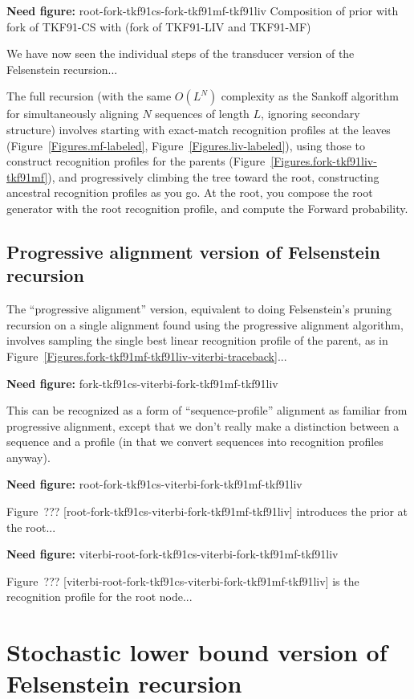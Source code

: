 \documentclass{article}
\newcommand{\figref}[1]{Figure~\ref{Figures.#1}}
\newcommand{\needfig}[1]{{\bf Need figure: } #1 }
\newcommand{\needfigref}[1]{Figure~??? [#1] }
\begin{document}
\needfig{root-fork-tkf91cs-fork-tkf91mf-tkf91liv
 Composition of prior with fork of TKF91-CS with (fork of TKF91-LIV and TKF91-MF)}

We have now seen the individual steps of the transducer version of the Felsenstein recursion...

The full recursion (with the same $O(L^N)$ complexity as the Sankoff algorithm
for simultaneously aligning $N$ sequences of length $L$, ignoring secondary structure)
involves starting with exact-match recognition profiles at the leaves (\figref{mf-labeled}, \figref{liv-labeled}),
using those to construct recognition profiles for the parents (\figref{fork-tkf91liv-tkf91mf}),
and progressively climbing the tree toward the root,
constructing ancestral recognition profiles as you go.
At the root, you compose the root generator with the root recognition profile,
and compute the Forward probability.

\subsection{Progressive alignment version of Felsenstein recursion}

The ``progressive alignment'' version,
equivalent to doing Felsenstein's pruning recursion on a single alignment
found using the progressive alignment algorithm,
involves sampling the single best linear recognition profile of the parent,
as in \figref{fork-tkf91mf-tkf91liv-viterbi-traceback}...

\needfig{fork-tkf91cs-viterbi-fork-tkf91mf-tkf91liv}

This can be recognized as a form of ``sequence-profile'' alignment as familiar from progressive alignment,
except that we don't really make a distinction between a sequence and a profile
(in that we convert sequences into recognition profiles anyway).

\needfig{root-fork-tkf91cs-viterbi-fork-tkf91mf-tkf91liv}

\needfigref{root-fork-tkf91cs-viterbi-fork-tkf91mf-tkf91liv} introduces the prior at the root...

\needfig{viterbi-root-fork-tkf91cs-viterbi-fork-tkf91mf-tkf91liv}

\needfigref{viterbi-root-fork-tkf91cs-viterbi-fork-tkf91mf-tkf91liv} is the recognition profile for the root node...

\section{Stochastic lower bound version of Felsenstein recursion}
\end{document}
